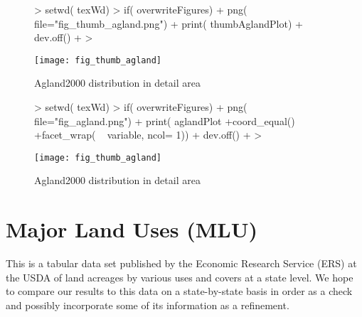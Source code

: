 \begin{figure} 
\begin{center}
  
\begin{Schunk}
\begin{Sinput}
> setwd( texWd)
> if( overwriteFigures) {
+   png( file="fig_thumb_agland.png")
+   print( thumbAglandPlot)
+   dev.off()
+ }
> 
\end{Sinput}
\end{Schunk}

\texttt{[image: fig\_thumb\_agland]}
\end{center} 
\caption{Agland2000 distribution in detail area}
\label{fig:thumb_agland} 
\end{figure} 

\begin{figure} 
\begin{center}
  
\begin{Schunk}
\begin{Sinput}
> setwd( texWd)
> if( overwriteFigures) {
+   png( file="fig_agland.png")
+   print( aglandPlot +coord_equal() +facet_wrap( ~ variable, ncol= 1))
+   dev.off()
+ }
> 
\end{Sinput}
\end{Schunk}

\texttt{[image: fig\_thumb\_agland]}
\end{center} 
\caption{Agland2000 distribution in detail area}
\label{fig:thumb_agland} 
\end{figure} 


\section{Major Land Uses (MLU)}
\label{sec:mlu}

This is a tabular data set published by the Economic Research Service
(ERS) at the USDA of land acreages by various uses and covers at a
state level.  We hope to compare our results to this data on a
state-by-state basis in order as a check and possibly incorporate some
of its information as a refinement.

\begin{Schunk}
\end{Schunk}

